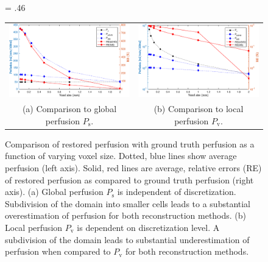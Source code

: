 \documentclass[final,5p,times,twocolumn]{elsarticle}
\begin{document}
    \begin{figure}[!htb]
    	\centering
    	\fwd = .46\textwidth
    	\begin{tabular}{c c}
    		\includegraphics[width=\fwd]{figs/E110_CBFOnDifferentResolutions_plot-Ps-scaleto-none.eps} & \includegraphics[width=\fwd]{figs/E110_CBFOnDifferentResolutions_plot-Pv-scaleto-none.eps}\\	
    		(a) Comparison to global perfusion $P_{\mathrm{s}}$. & (b) Comparison to local perfusion $P_{\mathrm{v}}$. \\
    	\end{tabular}
    	\caption{Comparison of restored perfusion with ground truth perfusion as a function of varying voxel size. Dotted, blue lines show average perfusion (left axis). Solid, red lines are average, relative errors (RE) of restored perfusion as compared to ground truth perfusion (right axis). (a) Global perfusion $P_{\mathrm{s}}$ is independent of discretization.  Subdivision of the domain into smaller cells leads to a substantial overestimation of perfusion for both reconstruction methods. (b) Local perfusion $P_{\mathrm{v}}$ is dependent on discretization level. A subdivision of the domain leads to substantial underestimation of perfusion when compared to $P_{\mathrm{v}}$ for both reconstruction methods.}
            \label{fig:volnormperf}
    \end{figure}
    
\end{document}
